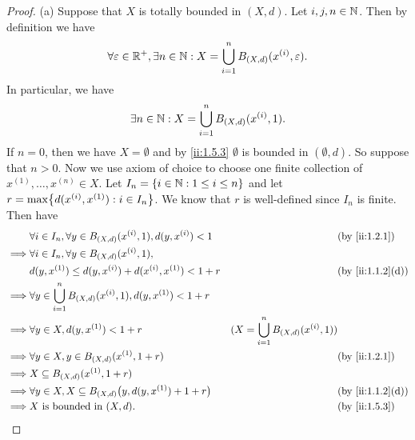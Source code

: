 \begin{proof}{(a)}
  Suppose that \(X\) is totally bounded in \((X, d)\).
  Let \(i, j, n \in \mathbb{N}\).
  Then by definition we have
  \[
    \forall \varepsilon \in \mathbb{R}^+, \exists n \in \mathbb{N} : X = \bigcup_{i = 1}^n B_{(X, d)}(x^{(i)}, \varepsilon).
  \]
  In particular, we have
  \[
    \exists n \in \mathbb{N} : X = \bigcup_{i = 1}^n B_{(X, d)}(x^{(i)}, 1).
  \]
  If \(n = 0\), then we have \(X = \emptyset\) and by \cref{ii:1.5.3} \(\emptyset\) is bounded in \((\emptyset, d)\).
  So suppose that \(n > 0\).
  Now we use axiom of choice to choose one finite collection of \(x^{(1)}, \dots, x^{(n)} \in X\).
  Let \(I_n = \left\lbrace i \in \mathbb{N} : 1 \leq i \leq n\right\rbrace\) and let \(r = \max\set{d(x^{(i)}, x^{(1)}) : i \in I_n}\).
  We know that \(r\) is well-defined since \(I_n\) is finite.
  Then have
  \begin{align*}
             & \forall i \in I_n, \forall y \in B_{(X, d)}(x^{(i)}, 1), d(y, x^{(i)}) < 1    &                                                & \by{ii:1.2.1}    \\
    \implies & \forall i \in I_n, \forall y \in B_{(X, d)}(x^{(i)}, 1),                                                                                          \\
             & d(y, x^{(1)}) \leq d(y, x^{(i)}) + d(x^{(i)}, x^{(1)}) < 1 + r                &                                                & \by{ii:1.1.2}[d] \\
    \implies & \forall y \in \bigcup_{i = 1}^n B_{(X, d)}(x^{(i)}, 1), d(y, x^{(1)}) < 1 + r                                                                     \\
    \implies & \forall y \in X, d(y, x^{(1)}) < 1 + r                                        & (X = \bigcup_{i = 1}^n B_{(X, d)}(x^{(i)}, 1))                    \\
    \implies & \forall y \in X, y \in B_{(X, d)}(x^{(1)}, 1 + r)                             &                                                & \by{ii:1.2.1}    \\
    \implies & X \subseteq B_{(X, d)}(x^{(1)}, 1 + r)                                                                                                            \\
    \implies & \forall y \in X, X \subseteq B_{(X, d)}\big(y, d(y, x^{(1)}) + 1 + r\big)     &                                                & \by{ii:1.1.2}[d] \\
    \implies & X \text{ is bounded in } (X, d).                                              &                                                & \by{ii:1.5.3}
  \end{align*}
\end{proof}

